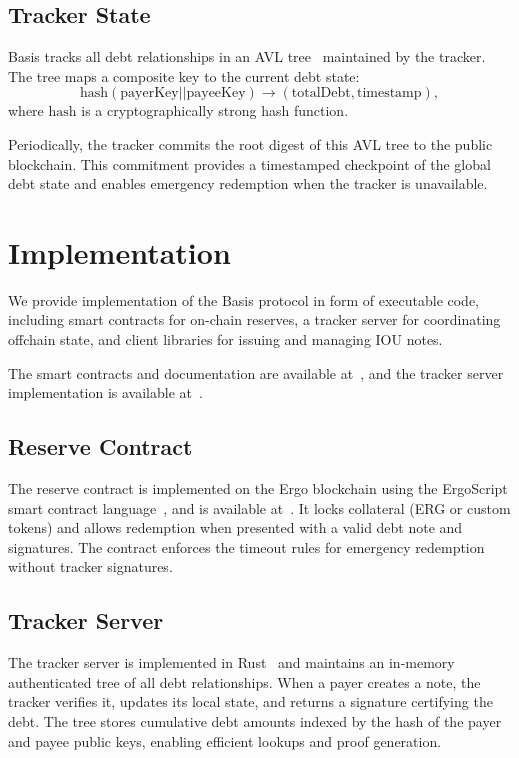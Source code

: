 \documentclass{ifcolog}
\newcommand{\basis}{Basis}
\begin{document}
\subsection{Tracker State}

\basis{} tracks all debt relationships in an AVL tree~\cite{reyzin2017improving} maintained by the tracker. The tree maps a composite key to the current debt state:
$$\text{hash}(\text{payerKey} || \text{payeeKey}) \rightarrow (\text{totalDebt}, \text{timestamp}),$$
where $\text{hash}$ is a cryptographically strong hash function.

Periodically, the tracker commits the root digest of this AVL tree to the public blockchain. This commitment provides a timestamped checkpoint of the global debt state and enables emergency redemption when the tracker is unavailable.

\section{Implementation}
\label{sec-impl}

We provide implementation of the \basis{} protocol in form of executable code, including smart contracts for on-chain reserves, a tracker server for coordinating offchain state, and client libraries for issuing and managing IOU notes.

The smart contracts and documentation are available at~\cite{chaincashcode}, and the tracker server implementation is available at~\cite{basistracker}.

\subsection{Reserve Contract}

The reserve contract is implemented on the Ergo blockchain using the ErgoScript smart contract language~\cite{ergo-whitepaper,ergoscript}, and is available at~\cite{reservecontract}. It locks collateral (ERG or custom tokens) and allows redemption when presented with a valid debt note and signatures. The contract enforces the timeout rules for emergency redemption without tracker signatures.

\subsection{Tracker Server}

The tracker server is implemented in Rust~\cite{matsakis2014rust} and maintains an in-memory authenticated tree of all debt relationships. When a payer creates a note, the tracker verifies it, updates its local state, and returns a signature certifying the debt. The tree stores cumulative debt amounts indexed by the hash of the payer and payee public keys, enabling efficient lookups and proof generation.
\end{document}
